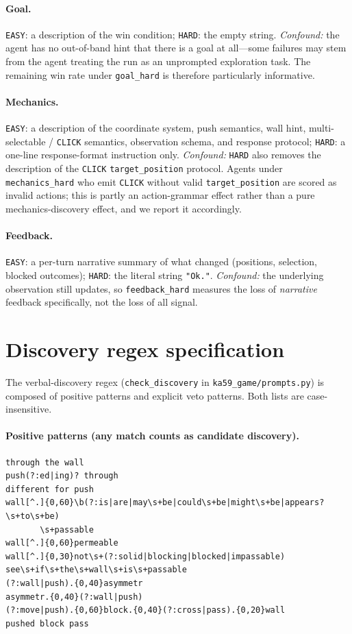 \documentclass{article}
\begin{document}
\paragraph{Goal.}
\texttt{EASY}: a description of the win condition; \texttt{HARD}: the empty string. \emph{Confound:} the agent has no out-of-band hint that there is a goal at all---some failures may stem from the agent treating the run as an unprompted exploration task. The remaining win rate under \texttt{goal\_hard} is therefore particularly informative.

\paragraph{Mechanics.}
\texttt{EASY}: a description of the coordinate system, push semantics, wall hint, multi-selectable / \texttt{CLICK} semantics, observation schema, and response protocol; \texttt{HARD}: a one-line response-format instruction only. \emph{Confound:} \texttt{HARD} also removes the description of the \texttt{CLICK} \texttt{target\_position} protocol. Agents under \texttt{mechanics\_hard} who emit \texttt{CLICK} without valid \texttt{target\_position} are scored as invalid actions; this is partly an action-grammar effect rather than a pure mechanics-discovery effect, and we report it accordingly.

\paragraph{Feedback.}
\texttt{EASY}: a per-turn narrative summary of what changed (positions, selection, blocked outcomes); \texttt{HARD}: the literal string \texttt{"Ok."}. \emph{Confound:} the underlying observation still updates, so \texttt{feedback\_hard} measures the loss of \emph{narrative} feedback specifically, not the loss of all signal.

\section{Discovery regex specification}
\label{app:regex}
The verbal-discovery regex (\texttt{check\_discovery} in \texttt{ka59\_game/prompts.py}) is composed of positive patterns and explicit veto patterns. Both lists are case-insensitive.

\paragraph{Positive patterns (any match counts as candidate discovery).}
\begin{verbatim}
through the wall
push(?:ed|ing)? through
different for push
wall[^.]{0,60}\b(?:is|are|may\s+be|could\s+be|might\s+be|appears?\s+to\s+be)
       \s+passable
wall[^.]{0,60}permeable
wall[^.]{0,30}not\s+(?:solid|blocking|blocked|impassable)
see\s+if\s+the\s+wall\s+is\s+passable
(?:wall|push).{0,40}asymmetr
asymmetr.{0,40}(?:wall|push)
(?:move|push).{0,60}block.{0,40}(?:cross|pass).{0,20}wall
pushed block pass
\end{verbatim}
\end{document}

